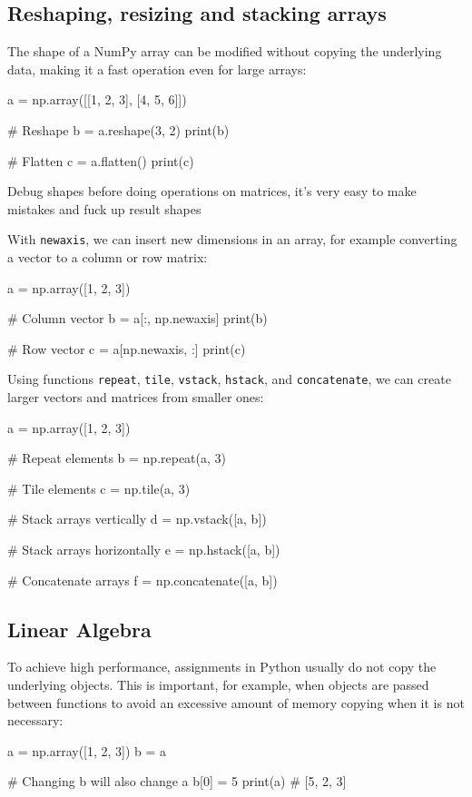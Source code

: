 \subsection{Reshaping, resizing and stacking arrays}

The shape of a NumPy array can be modified without copying the underlying data, making it a fast
operation even for large arrays:
\begin{codeblock}[language=python]
a = np.array([[1, 2, 3], [4, 5, 6]])

# Reshape
b = a.reshape(3, 2)
print(b)

# Flatten
c = a.flatten()
print(c)
\end{codeblock}

\begin{observationblock}
    Debug shapes before doing operations on matrices, it’s very easy to make mistakes and fuck up result shapes
\end{observationblock}

With \texttt{newaxis}, we can insert new dimensions in an array, for example converting a vector to a column or row matrix:
\begin{codeblock}[language=python]
a = np.array([1, 2, 3])

# Column vector
b = a[:, np.newaxis]
print(b)

# Row vector
c = a[np.newaxis, :]
print(c)
\end{codeblock}

Using functions \texttt{repeat}, \texttt{tile}, \texttt{vstack}, \texttt{hstack}, and \texttt{concatenate}, we can create larger
vectors and matrices from smaller ones:
\begin{codeblock}[language=python]
a = np.array([1, 2, 3])

# Repeat elements
b = np.repeat(a, 3)

# Tile elements
c = np.tile(a, 3)

# Stack arrays vertically
d = np.vstack([a, b])

# Stack arrays horizontally
e = np.hstack([a, b])

# Concatenate arrays
f = np.concatenate([a, b])
\end{codeblock}

\subsection{Linear Algebra}

To achieve high performance, assignments in Python usually do not copy the underlying objects.
This is important, for example, when objects are passed between functions to avoid an excessive
amount of memory copying when it is not necessary:
\begin{codeblock}[language=python]
a = np.array([1, 2, 3])
b = a

# Changing b will also change a
b[0] = 5
print(a)  # [5, 2, 3]
\end{codeblock}

